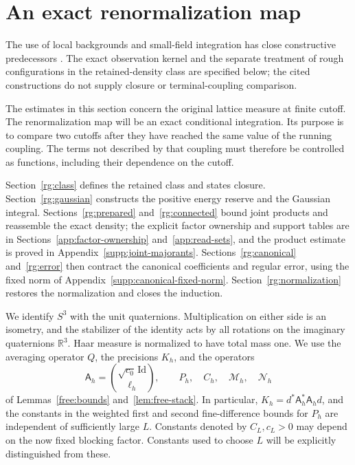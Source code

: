 \section{An exact renormalization map}
\label{rg:section}

The use of local backgrounds and small-field integration has close
constructive predecessors
\cite{BalabanFlow,BalabanVariational,DybalskiStottmeisterTanimotoVariational}.
The exact observation kernel and the separate treatment of rough
configurations in the retained-density class are specified below; the
cited constructions do not supply closure or terminal-coupling comparison.

The estimates in this section concern the original lattice measure at
finite cutoff.  The renormalization map will be an exact conditional
integration.  Its purpose is to compare two cutoffs after they have reached
the same value of the running coupling.  The terms not described by that
coupling must therefore be controlled as functions, including their
dependence on the cutoff.

Section~\ref{rg:class} defines the retained class and states closure.
Section~\ref{rg:gaussian} constructs the positive energy reserve and
the Gaussian integral. Sections~\ref{rg:prepared} and~\ref{rg:connected}
bound joint products and reassemble the exact density; the explicit
factor ownership and support tables are in
Sections~\ref{app:factor-ownership} and~\ref{app:read-sets}, and the
product estimate is proved in Appendix~\ref{supp:joint-majorants}.
Sections~\ref{rg:canonical} and~\ref{rg:error} then contract the
canonical coefficients and regular error, using the fixed norm of
Appendix~\ref{supp:canonical-fixed-norm}. Section~\ref{rg:normalization}
restores the normalization and closes the induction.

We identify $S^3$ with the unit quaternions.  Multiplication on either side
is an isometry, and the stabilizer of the identity acts by all rotations
on the imaginary quaternions $\mathbb R^3$.  Haar measure is normalized to
have total mass one.  We use the averaging operator $Q$, the precisions
$K_h$, and the operators
\[
 \mathsf A_h=\binom{\sqrt{c_0}\,\mathrm{Id}}{\ell_h},\qquad
 P_h,\quad C_h,\quad \mathcal M_h,\quad\mathcal N_h
\]
of Lemmas~\ref{free:bounds} and~\ref{lem:free-stack}.  In particular,
$K_h=d^*\mathsf A_h^*\mathsf A_h d$, and the constants in the weighted
first and second fine-difference bounds for $P_h$ are independent of
sufficiently large $L$.  Constants denoted by $C_L,c_L>0$ may depend on
the now fixed blocking factor.  Constants used to choose $L$ will be
explicitly distinguished from these.

